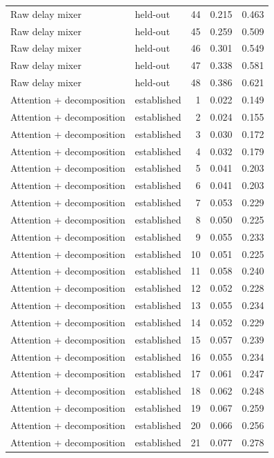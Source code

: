 \begin{tabular}{llrrr}
Raw delay mixer & held-out & 44 & 0.215 & 0.463 \\
Raw delay mixer & held-out & 45 & 0.259 & 0.509 \\
Raw delay mixer & held-out & 46 & 0.301 & 0.549 \\
Raw delay mixer & held-out & 47 & 0.338 & 0.581 \\
Raw delay mixer & held-out & 48 & 0.386 & 0.621 \\
Attention + decomposition & established & 1 & 0.022 & 0.149 \\
Attention + decomposition & established & 2 & 0.024 & 0.155 \\
Attention + decomposition & established & 3 & 0.030 & 0.172 \\
Attention + decomposition & established & 4 & 0.032 & 0.179 \\
Attention + decomposition & established & 5 & 0.041 & 0.203 \\
Attention + decomposition & established & 6 & 0.041 & 0.203 \\
Attention + decomposition & established & 7 & 0.053 & 0.229 \\
Attention + decomposition & established & 8 & 0.050 & 0.225 \\
Attention + decomposition & established & 9 & 0.055 & 0.233 \\
Attention + decomposition & established & 10 & 0.051 & 0.225 \\
Attention + decomposition & established & 11 & 0.058 & 0.240 \\
Attention + decomposition & established & 12 & 0.052 & 0.228 \\
Attention + decomposition & established & 13 & 0.055 & 0.234 \\
Attention + decomposition & established & 14 & 0.052 & 0.229 \\
Attention + decomposition & established & 15 & 0.057 & 0.239 \\
Attention + decomposition & established & 16 & 0.055 & 0.234 \\
Attention + decomposition & established & 17 & 0.061 & 0.247 \\
Attention + decomposition & established & 18 & 0.062 & 0.248 \\
Attention + decomposition & established & 19 & 0.067 & 0.259 \\
Attention + decomposition & established & 20 & 0.066 & 0.256 \\
Attention + decomposition & established & 21 & 0.077 & 0.278 \\

\end{tabular}
